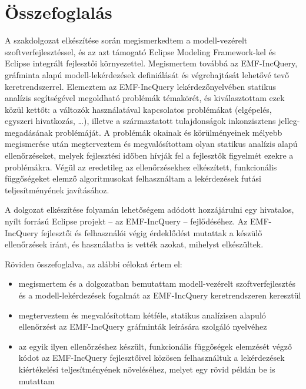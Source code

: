 \chapter{Összefoglalás}
\label{chap:summary}

A szakdolgozat elkészítése során megismerkedtem a modell-vezérelt szoftverfejlesztéssel, és az azt támogató Eclipse Modeling Framework-kel és Eclipse integrált fejlesztői környezettel.
Megismertem továbbá az EMF-IncQuery, gráfminta alapú modell-lekérdezések definiálását és végrehajtását lehetővé tevő keretrendszerrel.
Elemeztem az EMF-IncQuery lekérdezőnyelvében statikus analízis segítségével megoldható problémák témakörét, és kiválasztottam ezek közül kettőt: a változók használatával kapcsolatos problémákat (elgépelés, egyszeri hivatkozás, \ldots), illetve a származtatott tulajdonságok inkonzisztens jelleg-megadásának problémáját.
A problémák okainak és körülményeinek mélyebb megismerése után megterveztem és megvalósítottam olyan statikus analízis alapú ellenőrzéseket, melyek fejlesztési időben hívják fel a fejlesztők figyelmét ezekre a problémákra.
Végül az eredetileg az ellenőrzésekhez elkészített, funkcionális függőségeket elemző algoritmusokat felhasználtam a lekérdezések futási teljesítményének javításához.

A dolgozat elkészítése folyamán lehetőségem adódott hozzájárulni egy hivatalos, nyílt forrású Eclipse projekt -- az EMF-IncQuery -- fejlődéséhez.
Az EMF-IncQuery fejlesztői és felhasználói végig érdeklődést mutattak a készülő ellenőrzések iránt, és használatba is vették azokat, mihelyst elkészültek.

Röviden összefoglalva, az alábbi célokat értem el:
\begin{itemize}
    \item megismertem és a dolgozatban bemutattam modell-vezérelt szoftverfejlesztés és a modell-lekérdezések fogalmát az EMF-IncQuery keretrendszeren keresztül 
    \item megterveztem és megvalósítottam kétféle, statikus analízisen alapuló ellenőrzést az EMF-IncQuery gráfminták leírására szolgáló nyelvéhez
    \item az egyik ilyen ellenőrzéshez készült, funkcionális függőségek elemzését végző kódot az EMF-IncQuery fejlesztőivel közösen felhasználtuk a lekérdezések kiértékelési teljesítményének növeléséhez, melyet egy rövid példán be is mutattam
\end{itemize}

